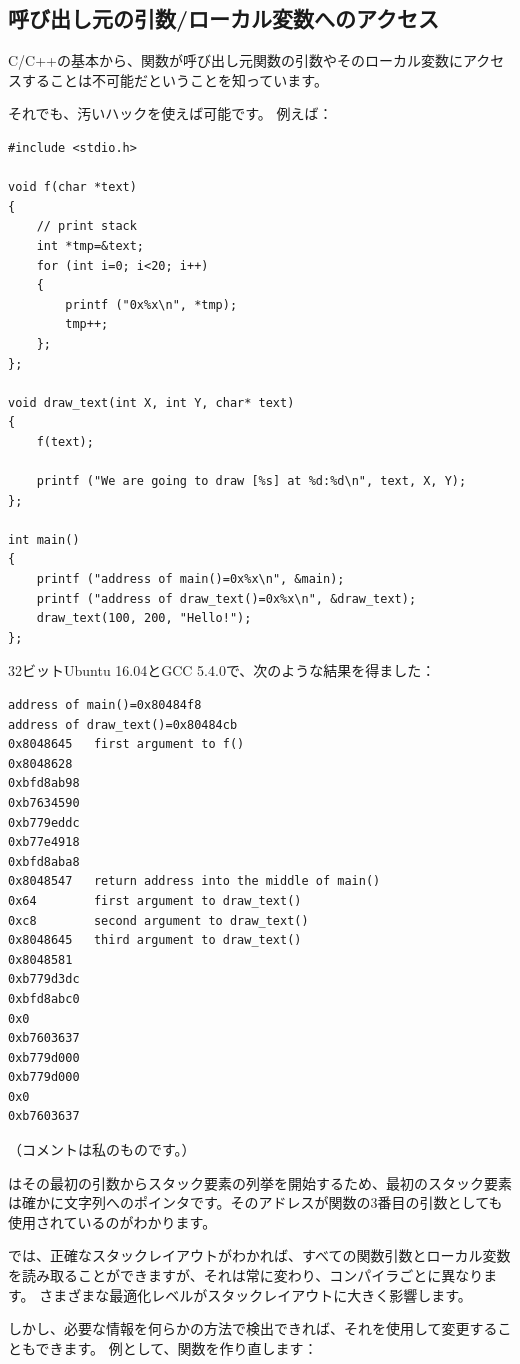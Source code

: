 \subsection{呼び出し元の引数/ローカル変数へのアクセス}

C/C++の基本から、関数が呼び出し元関数の引数やそのローカル変数にアクセスすることは不可能だということを知っています。

それでも、汚いハックを使えば可能です。
例えば：

\begin{lstlisting}[style=customc]
#include <stdio.h>

void f(char *text)
{
	// print stack
	int *tmp=&text;
	for (int i=0; i<20; i++)
	{
		printf ("0x%x\n", *tmp);
		tmp++;
	};
};

void draw_text(int X, int Y, char* text)
{
	f(text);

	printf ("We are going to draw [%s] at %d:%d\n", text, X, Y);
};

int main()
{
	printf ("address of main()=0x%x\n", &main);
	printf ("address of draw_text()=0x%x\n", &draw_text);
	draw_text(100, 200, "Hello!");
};
\end{lstlisting}

32ビットUbuntu 16.04とGCC 5.4.0で、次のような結果を得ました：

\begin{lstlisting}
address of main()=0x80484f8
address of draw_text()=0x80484cb
0x8048645	first argument to f()
0x8048628
0xbfd8ab98
0xb7634590
0xb779eddc
0xb77e4918
0xbfd8aba8
0x8048547	return address into the middle of main()
0x64		first argument to draw_text()
0xc8		second argument to draw_text()
0x8048645	third argument to draw_text()
0x8048581
0xb779d3dc
0xbfd8abc0
0x0
0xb7603637
0xb779d000
0xb779d000
0x0
0xb7603637
\end{lstlisting}

（コメントは私のものです。）

はその最初の引数からスタック要素の列挙を開始するため、最初のスタック要素は確かに文字列へのポインタです。そのアドレスが関数の3番目の引数としても使用されているのがわかります。

では、正確なスタックレイアウトがわかれば、すべての関数引数とローカル変数を読み取ることができますが、それは常に変わり、コンパイラごとに異なります。
さまざまな最適化レベルがスタックレイアウトに大きく影響します。

しかし、必要な情報を何らかの方法で検出できれば、それを使用して変更することもできます。
例として、関数を作り直します：

